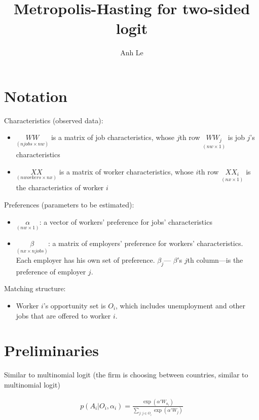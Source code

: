 \documentclass[12pt]{article}
\title{Metropolis-Hasting for two-sided logit}
\author{Anh Le}
\begin{document}
\maketitle

\section{Notation}

Characteristics (observed data):
\begin{itemize}[noitemsep]
\item $\underset{(njobs \times nw)}{WW}$ is a matrix of job characteristics, whose $j$th row $\underset{(nw \times 1)}{WW_j}$ is job $j$'s characteristics
\item $\underset{(nworkers \times nx)}{XX}$ is a matrix of worker characteristics, whose $i$th row $\underset{(nx \times 1)}{XX_i}$ is the characteristics of worker $i$
\end{itemize}

Preferences (parameters to be estimated):
\begin{itemize}[noitemsep]
\item $\underset{(nw \times 1)}{\alpha}$: a vector of workers' preference for jobs' characteristics
\item $\underset{(nx \times njobs)}{\beta}$: a matrix of employers' preference for workers' characteristics. Each employer has his own set of preference. $\beta_j$--- $\beta$'s $j$th column---is the preference of employer $j$.
\end{itemize}

Matching structure:
\begin{itemize}
\item Worker $i$'s opportunity set is $O_i$, which includes unemployment and other jobs that are offered to worker $i$.
\end{itemize}

\section{Preliminaries}

Similar to multinomial logit (the firm is choosing between countries, similar to multinomial logit)

\begin{align}
p(A_i | O_i, \alpha_i) = \frac{\exp(\alpha'W_{a_i})}{\sum\limits_{j:j \in O_i} \exp(\alpha'W_j)} \label{eq:conditional_probability_of_accept}
\end{align}
\end{document}
